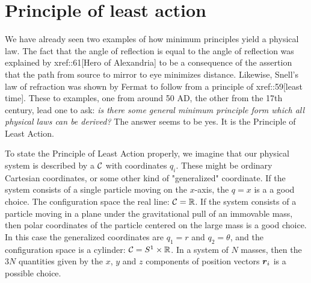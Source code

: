 
\begin{mathmacro}
\newcommand{\bra}[0]{\langle}
\newcommand{\ket}[0]{\rangle}
\newcommand{\caF}[0]{\mathcal{F}}
\newcommand{\caA}[0]{\mathcal{A}}
\newcommand{\caC}[0]{\mathcal{C}}
\newcommand{\caP}[0]{\mathcal{P}}
\newcommand{\boR}[0]{\boldsymbol{R}}
\newcommand{\bor}[0]{\boldsymbol{r}}
\newcommand{\bov}[0]{\boldsymbol{v}}
\newcommand{\boi}[0]{\boldsymbol{i}}
\newcommand{\boa}[0]{\boldsymbol{a}}
\newcommand{\boL}[0]{\boldsymbol{L}}
\newcommand{\bbR}[0]{\mathbb{R}}
\newcommand{\sett}[2]{\{#1\ |\ #2 \}}
\end{mathmacro}

\setcounter{section}{14}

\section{Principle of least action}

We have already seen two examples of how minimum principles yield a physical law.  The fact that the angle of reflection is equal to the angle of reflection was explained by xref::61[Hero of Alexandria] to be a consequence of the assertion that the path from source to mirror to eye minimizes distance.  Likewise, Snell's law of refraction was shown by Fermat to follow from a principle of xref::59[least time]. These to examples, one from around 50 AD, the other from the 17th century, lead one to ask: \emph{is there some general minimum principle form which all physical laws can be derived?}  The answer seems to be yes.  It is the Principle of Least Action.

To state the Principle of Least Action properly, we imagine that our physical system is described by a  $\caC$ with coordinates $q_i$.  These might be ordinary Cartesian coordinates, or some other kind of "generalized" coordinate.  If the system consists of a  single particle moving on the $x$-axis, the $q = x$ is a a good choice. The configuration space the real line: $\caC = \bbR$.  If the system consists of a particle moving in a plane under the gravitational pull of an immovable mass, then polar coordinates of the  particle centered on the large mass is a good choice.   In this case the generalized coordinates are $q_1 = r$ and $q_2 = \theta$, and the configuration space is  a cylinder: $\caC = S^1\times \bbR$.   In a system of $N$ masses, then the $3N$ quantities given by the $x$, $y$ and $z$ components of position vectors $\bor_i$ is a possible choice.

